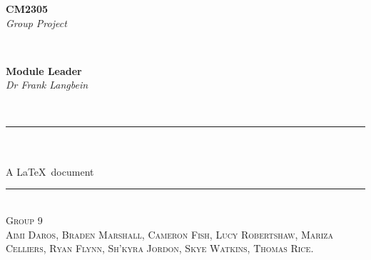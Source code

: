\begin{titlepage} %
\newcommand{\HRule}{\rule{\linewidth}{1.5mm}} %

\center %

\begin{minipage}{0.4\textwidth} %
\begin{flushleft} %
\textbf{\large CM2305} %
\\ %
\emph{\large Group Project} %
\end{flushleft}
\end{minipage}
~ %
\begin{minipage}{0.4\textwidth}
\begin{flushright}
\textbf{\large Module Leader}
\\
\emph{\large Dr Frank Langbein} 
\end{flushright}
\end{minipage}
\\[2cm] %

{\makeColourful \HRule} 
\\[2cm]
{\fontsize{90pt}{0pt}\selectfont {}} %
\\[1.5cm]
A \LaTeX\ document %
{\makeColourful \HRule}
\\[6cm]

\textsc{\Large Group 9}
\\[0.5cm] 
\textsc{Aimi Daros, Braden Marshall, Cameron Fish, Lucy Robertshaw, Mariza Celliers, Ryan Flynn, Sh’kyra Jordon, Skye Watkins, Thomas Rice.}

\end{titlepage}

